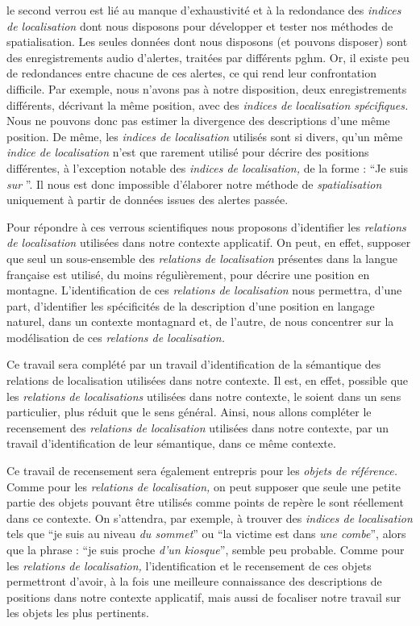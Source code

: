le second verrou est lié au manque d’exhaustivité et à la redondance
des \emph{indices de localisation} dont nous disposons pour développer
et tester nos méthodes de spatialisation. Les seules données dont nous
disposons (et pouvons disposer) sont des enregistrements audio
d'alertes, traitées par différents \ac{pghm}. Or, il existe peu de
redondances entre chacune de ces alertes, ce qui rend leur
confrontation difficile. Par exemple, nous n'avons pas à notre
disposition, deux enregistrements différents, décrivant la même
position, avec des \emph{indices de localisation spécifiques.} Nous ne
pouvons donc pas estimer la divergence des descriptions d'une même
position. De même, les \emph{indices de localisation} utilisés sont si
divers, qu'un même \emph{indice de localisation} n'est que rarement
utilisé pour décrire des positions différentes, à l'exception notable
des \emph{indices de localisation,} de la forme : \enquote{Je suis
  \emph{sur} }. Il
nous est donc impossible d’élaborer notre méthode de
\emph{spatialisation} uniquement à partir de données issues des
alertes passée.

Pour répondre à ces verrous scientifiques nous proposons d'identifier
les \emph{relations de localisation} utilisées dans notre contexte
applicatif. On peut, en effet, supposer que seul un sous-ensemble des
\emph{relations de localisation} présentes dans la langue française
est utilisé, du moins régulièrement, pour décrire une position en
montagne. L'identification de ces \emph{relations de localisation}
nous permettra, d'une part, d'identifier les spécificités de la
description d'une position en langage naturel, dans un contexte
montagnard et, de l'autre, de nous concentrer sur la modélisation de
ces \emph{relations de localisation.}

Ce travail sera complété par un travail d'identification de la
sémantique des relations de localisation utilisées dans notre
contexte. Il est, en effet, possible que les \emph{relations de
  localisations} utilisées dans notre contexte, le soient dans un sens
particulier, plus réduit que le sens général. Ainsi, nous allons
compléter le recensement des \emph{relations de localisation}
utilisées dans notre contexte, par un travail d'identification de leur
sémantique, dans ce même contexte.

Ce travail de recensement sera également entrepris pour les
\emph{objets de référence.} Comme pour les \emph{relations de
  localisation,} on peut supposer que seule une petite partie des
objets pouvant être utilisés comme points de repère le sont réellement
dans ce contexte. On s'attendra, par exemple, à trouver des
\emph{indices de localisation} tels que \enquote{je suis au niveau
  \emph{du sommet}} ou \enquote{la victime est dans \emph{une combe}},
alors que la phrase : \enquote{je suis proche \emph{d'un kiosque}},
semble peu probable. Comme pour les \emph{relations de localisation,}
l'identification et le recensement de ces objets permettront d'avoir,
à la fois une meilleure connaissance des descriptions de positions
dans notre contexte applicatif, mais aussi de focaliser notre travail
sur les objets les plus pertinents.


